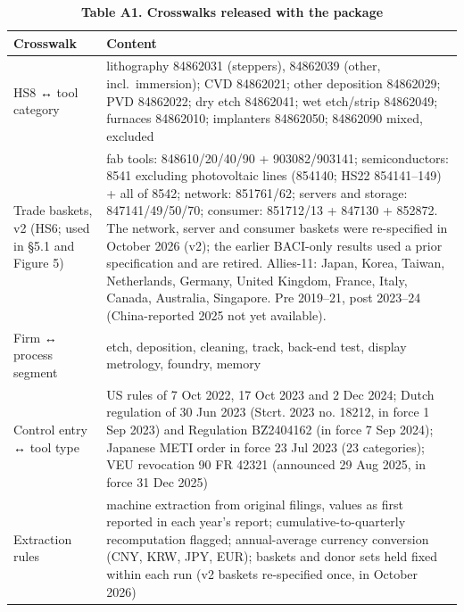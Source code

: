 \documentclass[12pt]{article}
\begin{document}
\begin{table}[htbp]\centering\footnotesize{}\caption*{\textbf{Table A1. Crosswalks released with the package}}\begin{tabular}{@{}
  >{\raggedright\arraybackslash}p{}
  >{\raggedright\arraybackslash}p{}@{}}
\toprule
\begin{minipage}[b]{\linewidth}\raggedright
Crosswalk
\end{minipage} & \begin{minipage}[b]{\linewidth}\raggedright
Content
\end{minipage} \\
\midrule
HS8 ↔ tool category & lithography 84862031 (steppers), 84862039 (other, incl.~immersion); CVD 84862021; other deposition 84862029; PVD 84862022; dry etch 84862041; wet etch/strip 84862049; furnaces 84862010; implanters 84862050; 84862090 mixed, excluded \\
\hdashline
Trade baskets, v2 (HS6; used in §5.1 and Figure 5) & fab tools: 848610/20/40/90 + 903082/903141; semiconductors: 8541 excluding photovoltaic lines (854140; HS22 854141--149) + all of 8542; network: 851761/62; servers and storage: 847141/49/50/70; consumer: 851712/13 + 847130 + 852872. The network, server and consumer baskets were re-specified in October 2026 (v2); the earlier BACI-only results used a prior specification and are retired. Allies-11: Japan, Korea, Taiwan, Netherlands, Germany, United Kingdom, France, Italy, Canada, Australia, Singapore. Pre 2019--21, post 2023--24 (China-reported 2025 not yet available). \\
\hdashline
Firm ↔ process segment & etch, deposition, cleaning, track, back-end test, display metrology, foundry, memory \\
\hdashline
Control entry ↔ tool type & US rules of 7 Oct 2022, 17 Oct 2023 and 2 Dec 2024; Dutch regulation of 30 Jun 2023 (Stcrt. 2023 no. 18212, in force 1 Sep 2023) and Regulation BZ2404162 (in force 7 Sep 2024); Japanese METI order in force 23 Jul 2023 (23 categories); VEU revocation 90 FR 42321 (announced 29 Aug 2025, in force 31 Dec 2025) \\
\hdashline
Extraction rules & machine extraction from original filings, values as first reported in each year's report; cumulative-to-quarterly recomputation flagged; annual-average currency conversion (CNY, KRW, JPY, EUR); baskets and donor sets held fixed within each run (v2 baskets re-specified once, in October 2026) \\

\end{tabular}
\end{table}
\end{document}
